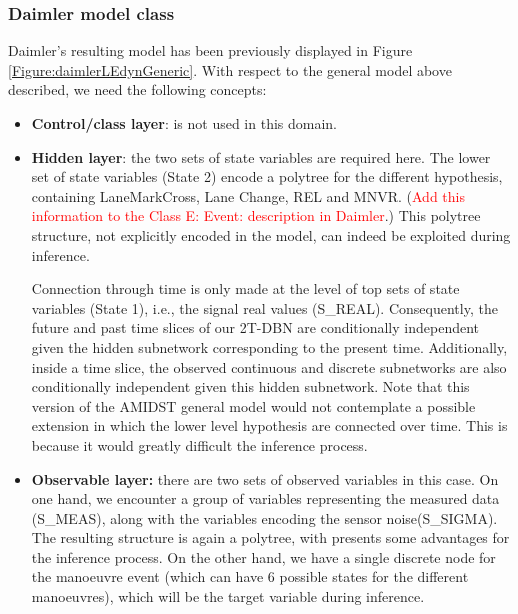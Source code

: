 \subsubsection{Daimler model class}\label{daimlerAMIDSTModels}


Daimler's resulting model has been previously displayed in Figure \ref{Figure:daimlerLEdynGeneric}. With respect to the general model above described, we need the following concepts:

\begin{itemize}
\item \textbf{Control/class layer}: is not used in this domain.

\item \textbf{Hidden layer}: the two sets of state variables are required here. The lower set of state variables (State 2) encode a polytree \cite{JensenNielsen2007} for the different hypothesis, containing LaneMarkCross, Lane Change, REL and MNVR. (\textcolor{red}{Add this information to the Class E: Event: description in Daimler}.) This polytree structure, not explicitly encoded in the model, can indeed be exploited during inference.

Connection through time is only made at the level of top sets of state variables (State 1), i.e., the signal real values (S\_REAL). Consequently, the future and past time slices of our 2T-DBN are conditionally independent given the hidden subnetwork corresponding to the present time. Additionally, inside a time slice, the observed continuous and discrete subnetworks are also conditionally independent given this hidden subnetwork. Note that this version of the AMIDST general model would not contemplate a possible extension in which the lower level hypothesis are connected over time. This is because it would greatly difficult the inference process. 



\item \textbf{Observable layer:} there are two sets of observed variables in this case. On one hand, we encounter a group of variables representing the measured data (S\_MEAS), along with the variables encoding the sensor noise(S\_SIGMA). The resulting structure is again a polytree, with presents some advantages for the inference process. On the other hand, we have a single discrete node for the manoeuvre event (which can have 6 possible states for the different manoeuvres), which will be the target variable during inference. 
\end{itemize}


